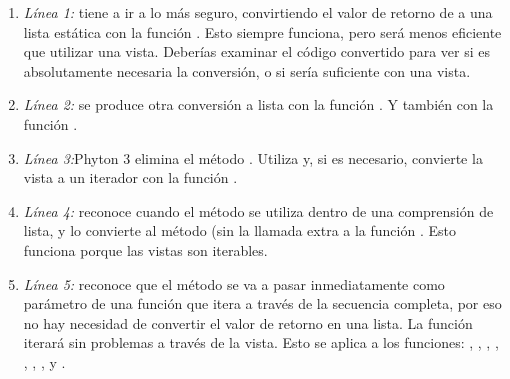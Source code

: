 \begin{enumerate}
  \item \emph{Línea 1:}  tiene a ir a lo más seguro, convirtiendo el valor de retorno de  a una lista estática con la función . Esto siempre funciona, pero será menos eficiente que utilizar una vista. Deberías examinar el código convertido para ver si es absolutamente necesaria la conversión, o si sería suficiente con una vista.
  \item \emph{Línea 2:} se produce otra conversión a lista con la función . Y también con la función .
  \item \emph{Línea 3:}Phyton 3 elimina el método . Utiliza  y, si es necesario, convierte la vista a un iterador con la función .
  \item \emph{Línea 4:}  reconoce cuando el método  se utiliza dentro de una comprensión de lista, y  lo convierte al método  (sin la llamada extra a la función . Esto funciona porque las vistas son iterables.
  \item \emph{Línea 5:}  reconoce que el método  se va a pasar inmediatamente como parámetro de una función que itera a través de la secuencia completa, por eso no hay necesidad de convertir el valor de retorno en una lista. La función  iterará sin problemas a través de la vista. Esto se aplica a los funciones: , , , , , , ,  y .
\end{enumerate}


